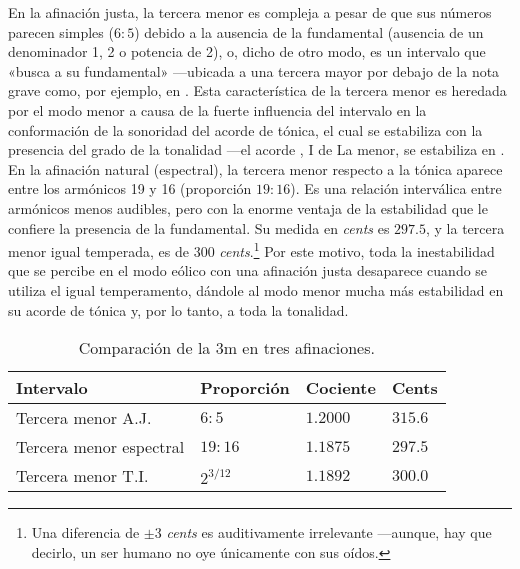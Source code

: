 \documentclass[a4paper,11pt]{article}
\begin{document}
\begin{multicols}{2}
  En la afinación justa, la tercera menor es compleja a pesar de que sus números parecen simples ($6:5$) debido a la ausencia de la fundamental (ausencia de un denominador 1, 2 o potencia de 2), o, dicho de otro modo, es un intervalo que «busca a su fundamental» ---ubicada a una tercera mayor por debajo de la nota grave como, por ejemplo,  en \hbox{.} Esta característica de la tercera menor es heredada por el modo menor a causa de la fuerte influencia del intervalo en la conformación de la sonoridad del acorde de tónica, el cual se estabiliza con la presencia del  grado de la tonalidad ---el acorde , I de La menor, se estabiliza en \hbox{.} En la afinación natural (espectral), la tercera menor respecto a la tónica aparece entre los armónicos 19 y 16 (proporción $19:16$). Es una relación interválica entre armónicos menos audibles, pero con la enorme ventaja de la estabilidad que le confiere la presencia de la fundamental. Su medida en \emph{cents} es $297.5$, y la tercera menor igual temperada, es de $300$ \emph{cents}.\footnote{Una diferencia de $\pm3$ \emph{cents} es auditivamente irrelevante ---aunque, hay que decirlo, un ser humano no oye únicamente con sus oídos.} Por este motivo, toda la inestabilidad que se percibe en el modo eólico con una afinación justa desaparece cuando se utiliza el igual temperamento, dándole al modo menor mucha más estabilidad en su acorde de tónica y, por lo tanto, a toda la tonalidad.
\end{multicols}

\begin{table}[ht]
  \centering
  \caption{Comparación de la 3m en tres afinaciones.}\label{tab:3m}
  \begin{tabular}{@{}llll@{}}
  \toprule
  Intervalo               & Proporción  & Cociente & Cents   \\ \midrule
  Tercera menor A.J.      & $6:5$       & $1.2000$ & $315.6$ \\
  Tercera menor espectral & $19:16$     & $1.1875$ & $297.5$ \\
  Tercera menor T.I.      & $2^{3/12}$  & $1.1892$ & $300.0$ \\ \bottomrule
  \end{tabular}
\end{table}
\end{document}

